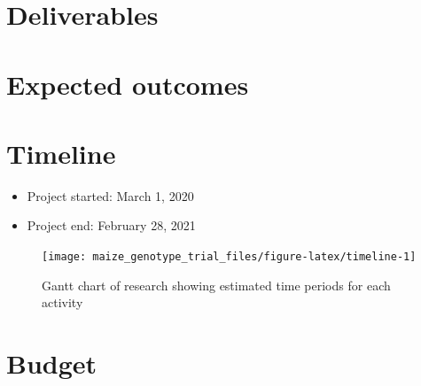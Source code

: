 \documentclass[
]{article}
\providecommand{\tightlist}{%
  \setlength{\itemsep}{0pt}\setlength{\parskip}{0pt}}
\begin{document}
\hypertarget{deliverables}{%
\section{Deliverables}\label{deliverables}}

\hypertarget{expected-outcomes}{%
\section{Expected outcomes}\label{expected-outcomes}}

\hypertarget{timeline}{%
\section{Timeline}\label{timeline}}

\begin{itemize}
\tightlist
\item
  Project started: March 1, 2020
\item
  Project end: February 28, 2021
\end{itemize}

\begin{figure}[H]

{\centering \texttt{[image: maize\_genotype\_trial\_files/figure-latex/timeline-1]} 

}

\caption{Gantt chart of research showing estimated time periods for each activity}\label{fig:timeline}
\end{figure}

\hypertarget{budget}{%
\section{Budget}\label{budget}}

\renewcommand*{\arraystretch}{0.75}
\setlength{\baselineskip}{0.5\baselineskip}
\end{document}
